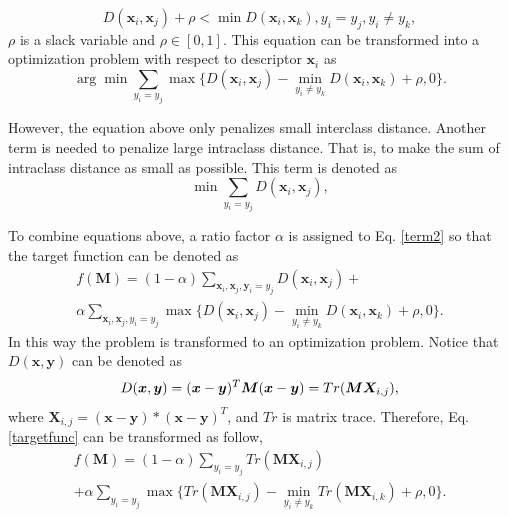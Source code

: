 \documentclass[10pt,twocolumn,letterpaper]{article}
\begin{document}
 \begin{equation}
 D(\bm{x}_i,\bm{x}_j) + \rho < \min D(\bm{x}_i,\bm{x}_k), y_i = y_j, y_i\ne y_k,
 \end{equation}
 $\rho$ is a slack variable and $\rho \in [0,1]$. This equation can be transformed into a optimization problem with respect to descriptor $\bm{x}_i$ as
 \begin{equation}\label{term2}
 \arg \min \sum_{y_i = y_j} \max \{D(\bm{x}_i,\bm{x}_j) -  \min_{ y_i\ne y_k} D(\bm{x}_i,\bm{x}_k)  + \rho, 0 \}.
 \end{equation}
 
 However, the equation above only penalizes small interclass distance. Another term is needed to penalize large intraclass distance. That is, to make the sum of intraclass distance as small as possible. This term is denoted as 
 \begin{equation}
 \min \sum_{y_i = y_j} D(\bm{x}_i,\bm{x}_j),
 \end{equation}
 
 To combine equations above, a ratio factor $\alpha$ is assigned to Eq. \eqref{term2} so that the target function can be denoted as 
  \begin{equation}\label{targetfunc}
  \begin{aligned}
 f(\bm{M}) = (1-\alpha)\sum_{\bm{x}_i,\bm{x}_j,\bm{y}_i=y_j} D(\bm{x}_i,\bm{x}_j) + \\ 
 \alpha \sum_{\bm{x}_i,\bm{x}_j,y_i=y_j}\max\{{D(\bm{x}_i,\bm{x}_j)-\min_{y_i\ne y_k}{D(\bm{x}_i,\bm{x}_k)}+\rho,0}\}.
 \end{aligned}
 \end{equation}
 In this way the problem is transformed to an optimization problem. Notice that $D(\bm{x},\bm{y})$ can be denoted as 
 \begin{equation}
 D(\bm{x},\bm{y}) = (\bm{x} - \bm{y})^T\bm{M}(\bm{x} - \bm{y})\\ = Tr(\bm{M}\bm{X}_{i,j}),
 \end{equation}
 where $\bm{X}_{i,j} = (\bm{x} - \bm{y})*(\bm{x} - \bm{y})^T$, and $Tr$ is matrix trace. Therefore, Eq. \eqref{targetfunc} can be transformed as follow,
 \begin{equation}\label{targetfinal}
 \begin{aligned}
 f(\bm{M}) = (1-\alpha)\sum_{y_i = y_j}Tr(\bm{M}\bm{X}_{i,j}) \\
  + \alpha \sum_{y_i = y_j}\max\{Tr(\bm{M}\bm{X}_{i,j}) - \min_{y_i\ne y_k} Tr(\bm{M}\bm{X}_{i,k} )+ \rho,0\}.
 \end{aligned}
 \end{equation}
 
\end{document}
